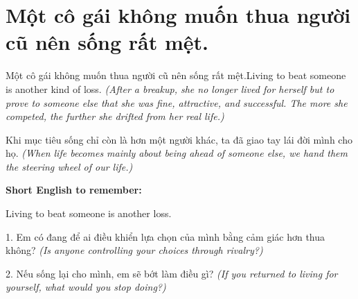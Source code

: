 \section{Một cô gái không muốn thua người cũ nên sống rất mệt.}
\begin{truyen}{Một cô gái không muốn thua người cũ nên sống rất mệt.}{Living to beat someone is another kind of loss.}
\textit{(After a breakup, she no longer lived for herself but to prove to someone else that she was fine, attractive, and successful. The more she competed, the further she drifted from her real life.)}
\end{truyen}
\begin{baihoc}
Khi mục tiêu sống chỉ còn là hơn một người khác, ta đã giao tay lái đời mình cho họ.
\textit{(When life becomes mainly about being ahead of someone else, we hand them the steering wheel of our life.)}
\end{baihoc}
\begin{ghinhoanh}\textbf{Short English to remember:}

Living to beat someone is another loss.
\end{ghinhoanh}
\begin{tuhocnhanh}
1. Em có đang để ai điều khiển lựa chọn của mình bằng cảm giác hơn thua không? \textit{(Is anyone controlling your choices through rivalry?)}

2. Nếu sống lại cho mình, em sẽ bớt làm điều gì? \textit{(If you returned to living for yourself, what would you stop doing?)}
\end{tuhocnhanh}
\ngancach